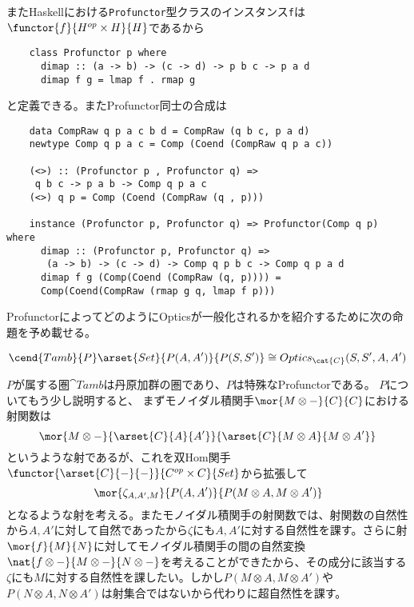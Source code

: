\documentclass[uplatex,dvipdfmx]{jsarticle}
\newcommand{\pr}[1]{\colorbox[rgb]{0.9,0.9,0.9}{\lstinline{#1}}}
\begin{document}
  またHaskellにおける\pr{Profunctor}型クラスのインスタンス\pr{f}は$\functor{f}{H^{op}\times H}{H}$であるから
  \begin{lstlisting}
    class Profunctor p where
      dimap :: (a -> b) -> (c -> d) -> p b c -> p a d
      dimap f g = lmap f . rmap g
  \end{lstlisting}
  と定義できる。またProfunctor同士の合成は
  \begin{lstlisting}
    data CompRaw q p a c b d = CompRaw (q b c, p a d)
    newtype Comp q p a c = Comp (Coend (CompRaw q p a c))

    (<>) :: (Profunctor p , Profunctor q) =>
     q b c -> p a b -> Comp q p a c
    (<>) q p = Comp (Coend (CompRaw (q , p)))

    instance (Profunctor p, Profunctor q) => Profunctor(Comp q p) where
      dimap :: (Profunctor p, Profunctor q) =>
       (a -> b) -> (c -> d) -> Comp q p b c -> Comp q p a d
      dimap f g (Comp(Coend (CompRaw (q, p)))) = 
      Comp(Coend(CompRaw (rmap g q, lmap f p)))
  \end{lstlisting}
  ProfunctorによってどのようにOpticsが一般化されるかを紹介するために次の命題を予め載せる。
  \begin{prop}[Opticsの表現可能定理]
    \[\cend{Tamb}{P}\arset{Set}{P(A,A')}{P(S,S')}\cong Optics_\cat{C}(S,S',A,A')\]
  \end{prop}
  $P$が属する圏$\cat{Tamb}$は丹原加群の圏であり、$P$は特殊なProfunctorである。
  $P$についてもう少し説明すると、
  まずモノイダル積関手$\mor{M\otimes -}{C}{C}$における射関数は\[\mor{M\otimes -}{\arset{C}{A}{A'}}{\arset{C}{M\otimes A}{M\otimes A'}}\]というような射であるが、これを双Hom関手$\functor{\arset{C}{-}{-}}{C^{op}\times C}{Set}$から拡張して\[\mor{\zeta_{A,A',M}}{P(A,A')}{P(M\otimes A, M\otimes A')}\]となるような射を考える。またモノイダル積関手の射関数では、射関数の自然性から$A,A'$に対して自然であったから$\zeta$にも$A,A'$に対する自然性を課す。さらに射$\mor{f}{M}{N}$に対してモノイダル積関手の間の自然変換$\nat{f\otimes -}{M\otimes -}{N\otimes -}$を考えることができたから、その成分に該当する$\zeta$にも$M$に対する自然性を課したい。しかし$P(M\otimes A,M\otimes A')$や$P(N\otimes A, N\otimes A')$は射集合ではないから代わりに超自然性を課す。

  
\end{document}
